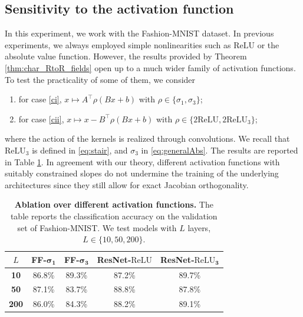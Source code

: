 \documentclass{article}
\theoremstyle{plain}
\theoremstyle{definition}
\theoremstyle{definition}
\theoremstyle{remark}
\theoremstyle{definition}
\theoremstyle{definition}
\theoremstyle{remark}
\numberwithin{equation}{section}
\begin{document}
\subsection{Sensitivity to the activation function}\label{app:ablation_act_fn}
In this experiment, we work with the Fashion-MNIST dataset. In previous experiments, we always employed simple nonlinearities such as $\mathrm{ReLU}$ or the absolute value function. However, the results provided by Theorem \ref{thm:char_RtoR_fields} open up to a much wider family of activation functions. To test the practicality of some of them, we consider
\begin{enumerate}[label=\arabic*)]
    \item for case \ref{ci}, $x \mapsto A^\top \rho(Bx + b)$ with $\rho\in\{\sigma_1, \sigma_3\}$;
    \item for case \ref{cii}, $x \mapsto x - B^\top \rho(Bx + b)$ with $\rho \in \{2\mathrm{ReLU}, 2\mathrm{ReLU}_3\}$;
\end{enumerate}
where the action of the kernels is realized through convolutions. We recall that $\mathrm{ReLU}_3$ is defined in \eqref{eq:stair}, and $\sigma_3$ in \eqref{eq:generalAbs}. The results are reported in Table \ref{tab:conv_pw}. In agreement with our theory, different activation functions with suitably constrained slopes do not undermine the training of the underlying architectures since they still allow for exact Jacobian orthogonality.

\begin{table}[h]
  \centering
  \caption{\textbf{Ablation over different activation functions.} The table reports the classification accuracy on the validation set of Fashion-MNIST. We test models with $L$ layers, $L\in\{10,50,200\}$.}
  \label{tab:conv_pw}
  \vspace{10pt}
  \setlength{\tabcolsep}{10pt}     %
  \begin{tabular}{c|cccc}
    \toprule
    $L$ & \textbf{FF-}$\mathbf{\sigma_1}$ & \textbf{FF-}$\mathbf{\sigma_3}$ & \textbf{ResNet‐}$\mathbf{\mathrm{ReLU}}$ & \textbf{ResNet‐}$\mathbf{\mathrm{ReLU}_3}$\\
    \midrule
    \textbf{10} & 86.8\% & 89.3\% & 87.2\% & 89.7\% \\
    \textbf{50} & 87.1\% & 83.7\% & 88.8\% & 87.8\% \\
    \textbf{200} & 86.0\% & 84.3\% & 88.2\% & 89.1\% \\
    \bottomrule
  \end{tabular}
\end{table}
\end{document}
